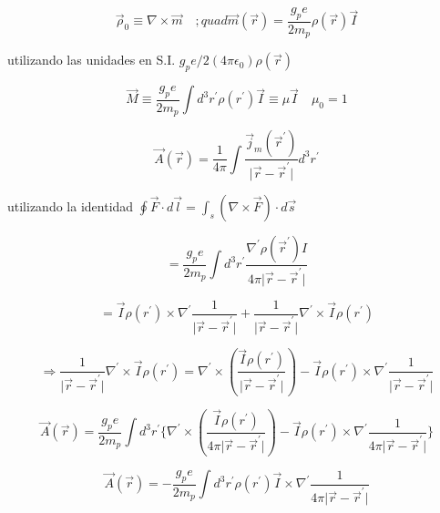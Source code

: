 \documentclass{report}
\begin{document}
\[\overrightarrow{\rho} _0 \equiv \nabla \times \overrightarrow{m} \quad ; quad \overrightarrow{m}(\overrightarrow{r})= \frac{g_p e}{2m_p } \rho (\overrightarrow{r}) \overrightarrow{I}\]

utilizando las unidades en S.I. $g_p e /2 (4 \pi \epsilon_0 ) \rho (\overrightarrow{r})$

\[\overrightarrow{M} \equiv \frac{g_p e}{2m_p } \int d^3 r^{\prime} \rho (r^{\prime}) \overrightarrow{I} \equiv \mu \overrightarrow{I} \quad \mu_0 = 1\]

\[\overrightarrow{A} (\overrightarrow{r}) = \frac{1}{4 \pi} \int \frac{\overrightarrow{j}_m (\overrightarrow{r}^{\prime})}{\vert \overrightarrow{r}-\overrightarrow{r}^{\prime}\vert } d^3 r^{\prime}\]

utilizando la identidad $\oint \overrightarrow{F} \cdot d\overrightarrow{l} = \int_s (\nabla \times \overrightarrow{F})\cdot d\overrightarrow{s}$

\[= \frac{g_p e}{2m_p } \int d^3 r^{\prime } \frac{\nabla^{\prime} \rho (\overrightarrow{r}^{\prime})I}{4 \pi \vert \overrightarrow{r}-\overrightarrow{r}^{\prime}\vert}\]

\[= \overrightarrow{I} \rho (r^{\prime}) \times \nabla^{\prime} \frac{1}{\vert \overrightarrow{r} - \overrightarrow{r}^{\prime}\vert} + \frac{1}{\vert \overrightarrow{r} - \overrightarrow{r}^{\prime}\vert} \nabla ^{\prime} \times \overrightarrow{I} \rho (r^{\prime})\]

\[\Rightarrow \frac{1}{\vert \overrightarrow{r} - \overrightarrow{r}^{\prime}\vert} \nabla^{\prime} \times \overrightarrow{I} \rho (r^{\prime}) = \nabla ^{\prime} \times (\frac{\overrightarrow{I}\rho (r^{\prime})}{\vert \overrightarrow{r} - \overrightarrow{r}^{\prime}\vert})- \overrightarrow{I} \rho (r^{\prime}) \times \nabla^{\prime} \frac{1}{\vert \overrightarrow{r} - \overrightarrow{r}^{\prime}\vert} \]

\[\overrightarrow{A} (\overrightarrow{r}) = \frac{g_p e}{2m_p } \int d^3 r^{\prime } \lbrace \nabla^{\prime} \times (\frac{\overrightarrow{I}\rho (r^{\prime})}{4 \pi \vert \overrightarrow{r} - \overrightarrow{r}^{\prime}\vert}) - \overrightarrow{I} \rho (r^{\prime}) \times \nabla^{\prime } \frac{1}{4 \pi \vert \overrightarrow{r} - \overrightarrow{r}^{\prime}\vert}\rbrace \]

\begin{equation}
\overrightarrow{A} (\overrightarrow{r}) =- \frac{g_p e}{2m_p } \int d^3 r^{\prime}\rho(r^{\prime}) \overrightarrow{I} \times \nabla ^{\prime} \frac{1}{4 \pi \vert \overrightarrow{r}-\overrightarrow{r}^{\prime}\vert} 
\end{equation}
\end{document}
